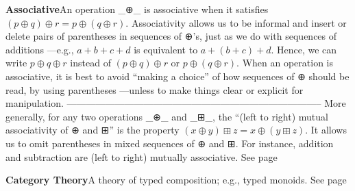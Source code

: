 \documentclass[11pt]{article}
\begin{document}
\vspace{1em}\textbf{Associative}\quad\label{org-special-block-extras-glossary-Associative}An operation _⊕_ is associative when it satisfies $(p ⊕ q) ⊕ r = p ⊕ (q ⊕ r)$.  Associativity allows us to be informal and insert or delete pairs of parentheses in sequences of ⊕'s, just as we do with sequences of additions ---e.g., $a + b + c + d$ is equivalent to $a + (b + c) + d$.  Hence, we can write $p ⊕ q ⊕ r$ instead of $(p ⊕ q) ⊕ r$ or $p ⊕ (q ⊕ r)$.  When an operation is associative, it is best to avoid “making a choice” of how sequences of ⊕ should be read, by using parentheses ---unless to make things clear or explicit for manipulation.  --------------------------------------------------------------------------------  More generally, for any two operations _⊕_ and _⊞_, the “(left to right) mutual associativity of ⊕ and ⊞” is the property $(x ⊕ y) ⊞ z = x ⊕ (y ⊞ z)$. It allows us to omit parentheses in mixed sequences of ⊕ and ⊞. For instance, addition and subtraction are (left to right) mutually associative. See page \pageref{org-special-block-extras-glossary-declaration-site-Associative}

\vspace{1em}\textbf{Category Theory}\quad\label{org-special-block-extras-glossary-cat}A theory of typed \quad composition; e.g., typed monoids. See page \pageref{org-special-block-extras-glossary-declaration-site-cat}
\end{document}

